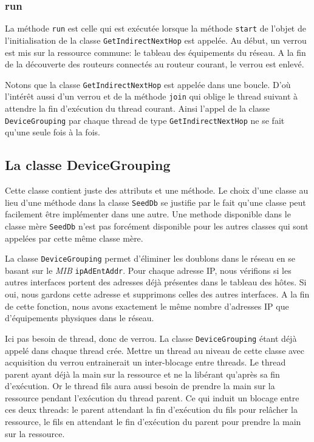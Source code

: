 \subsubsection{run}
La méthode \texttt{run} est celle qui est exécutée lorsque la méthode \texttt{start} de l'objet de l'initialisation de la classe \texttt{GetIndirectNextHop} est appelée. Au début, un verrou est mis sur la ressource commune: le tableau des équipements du réseau. A la fin de la découverte des routeurs connectés au routeur courant, le verrou est enlevé. 

Notons que la classe \texttt{GetIndirectNextHop} est appelée dans une boucle. D'où l'intérêt aussi d'un verrou et de la méthode \texttt{join} qui oblige le thread suivant à attendre la fin d'exécution du thread courant. Ainsi l'appel de la classe \texttt{DeviceGrouping} par chaque thread de type \texttt{GetIndirectNextHop} ne se fait qu'une seule fois à la fois.


\subsection{La classe DeviceGrouping}
Cette classe contient juste des attributs et une méthode. Le choix d'une classe au lieu d'une méthode dans la classe \texttt{SeedDb} se justifie par le fait qu'une classe peut facilement être implémenter dans une autre. Une methode disponible dans le classe mère \texttt{SeedDb} n'est pas forcément disponible pour les autres classes qui sont appelées par cette même classe mère.

La classe \texttt{DeviceGrouping} permet d'éliminer les doublons dans le réseau en se basant sur le \emph{MIB} \texttt{ipAdEntAddr}. Pour chaque adresse IP, nous vérifions si les autres interfaces portent des adresses déjà présentes dans le tableau des hôtes. Si oui, nous gardons cette adresse et supprimons celles des autres interfaces. A la fin de cette fonction, nous avons exactement le même nombre d'adresses IP que d'équipements physiques dans le réseau.

Ici pas besoin de thread, donc de verrou. La classe \texttt{DeviceGrouping} étant déjà appelé dans chaque thread crée. Mettre un thread au niveau de cette classe avec acquisition du verrou entrainerait un inter-blocage entre threads. Le thread parent ayant déjà la main sur la ressource et ne la libérant qu'après sa fin d'exécution. Or le thread fils aura aussi besoin de prendre la main sur la ressource pendant l'exécution du thread parent. Ce qui induit un blocage entre ces deux threads: le parent attendant la fin d'exécution du fils pour relâcher la ressource, le fils en attendant le fin d'exécution du parent pour prendre la main sur la ressource.

